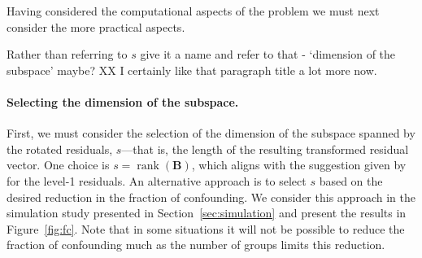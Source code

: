 \documentclass[12pt]{article} %
\newcommand{\hh}[1]{{\color{orange} #1}}
\newcommand{\al}[1]{{\color{red} #1}}
\newcommand{\ginv}{\ensuremath{^{-}}}
\DeclareMathOperator{\rank}{rank}
\begin{document}
Having considered the computational aspects of the problem we must next consider the more practical aspects. 

\hh{Rather than referring to $s$ give it a name and refer to that - `dimension of the subspace' maybe?} \al{XX I certainly like that paragraph title a lot more now.}
\paragraph{Selecting the dimension of the subspace.}
First, we must consider the selection of the dimension of the subspace spanned by the rotated residuals, $s$---that is, the length of the resulting transformed residual vector. One choice is $s = \rank(\bm{B})$, which aligns with the suggestion given by \cite{HildenMinton:1995wh} for the level-1 residuals. 
An alternative approach is to select $s$ based on the desired reduction in the fraction of confounding. 
We consider this approach in the simulation study presented in Section~\ref{sec:simulation} and present the results in Figure~\ref{fig:fc}. Note that in some situations it will not be possible to reduce the fraction of confounding much as the number of groups limits this reduction.
\end{document}
